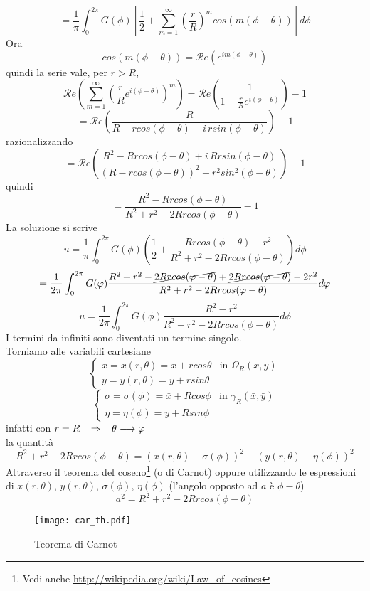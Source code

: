 \[
	= \frac{1}{\pi} \int_{0}^{2\pi} G(\phi)
	\left[
	\frac{1}{2}+ \sum_{m=1}^{\infty} \left( \frac{r}{R} \right)^m
	cos (m(\phi - \theta))
	\right] d\phi
\]
Ora
\[
	cos(m(\phi - \theta))= {\mathcal Re}(e^{im(\phi - \theta)})
\]
quindi la serie vale, per $r>R$,
\[
	{\mathcal Re} \left(
	\sum_{m=1}^{\infty} \left( \frac{r}{R} e^{i(\phi - \theta)} \right)^m
	\right)
	=
	{\mathcal Re} \left(
	\frac{1}{1 - \frac{r}{R} e^{i(\phi - \theta)}}
	\right) -1
\]
\[
	= {\mathcal Re} \left(
	\frac{R}{R -rcos(\phi - \theta) - i \, rsin (\phi - \theta)}
	\right) -1
\]
razionalizzando
\[
	= {\mathcal Re} \left(
	\frac{R^2 - Rrcos(\phi - \theta) + i \, Rr sin (\phi - \theta)}
	{\left( R- rcos (\phi - \theta) \right)^2 + r^2 sin^2 (\phi - \theta)}
	\right) -1
\]
quindi
\[
	=\frac{R^2 - Rrcos(\phi - \theta)}
	{R^2 + r^2 -2Rrcos(\phi - \theta)}
	-1
\]
La soluzione si scrive 
\[
	u= \frac{1}{\pi} \int_{0}^{2\pi} G(\phi)
	\left( \frac{1}{2}+
	\frac{Rrcos(\phi - \theta) -r^2}
	{R^2 + r^2 -2Rrcos(\phi - \theta)}
	\right)
	d\phi
\]
\[
	= \frac{1}{2 \pi} \int_{0}^{2\pi} G(\phi)
	\frac{R^2 + r^2 -\cancel{2Rrcos(\phi - \theta)} + 
	\cancel{2Rrcos(\phi - \theta)} -2r^2 }
	{R^2 + r^2 -2Rrcos(\phi - \theta)}
	d\phi
\]
\[
	u = \frac{1}{2 \pi} \int_{0}^{2\pi} G(\phi)
	\frac{R^2 - r^2 }
	{R^2 + r^2 -2Rrcos(\phi - \theta)}
	d\phi
\]
I termini da infiniti sono diventati un termine singolo.\\
Torniamo alle variabili cartesiane
\[
	\left\{ 
	\begin{array}{ll}
		x= x(r, \theta)= \bar{x} + rcos \theta 
		& \text{in } \Omega_R (\bar{x},\bar{y}) \\
		y= y(r, \theta)= \bar{y} + rsin \theta
	\end{array}
	\right.
\]
\[
	\left\{ 
	\begin{array}{ll}
		\sigma= \sigma(\phi)= \bar{x} + Rcos \phi
		& \text{in } \gamma_R (\bar{x},\bar{y}) \\
		\eta= \eta(\phi)= \bar{y} + Rsin \phi
	\end{array}
	\right. 
\]
infatti con $r=R \follows \theta \longrightarrow \phi$ \\
la quantit\`a
\[
	R^2 + r^2 -2Rrcos(\phi - \theta) =
	\left( x(r, \theta)- \sigma (\phi) \right)^2 +
	\left( y(r, \theta)- \eta (\phi) \right)^2
\]
Attraverso il teorema del coseno\footnote{Vedi anche
\url{http://wikipedia.org/wiki/Law_of_cosines}
} (o di Carnot) oppure utilizzando le espressioni di 
$x (r, \theta)$, $y(r, \theta)$, $\sigma (\phi)$, $\eta (\phi)$ (l'angolo
opposto ad $a$ \`e $\phi - \theta$)
\[
a^2= R^2 +r^2 -2Rrcos(\phi - \theta)
\]
\begin{figure}[H]
	\centering
	\texttt{[image: car\_th.pdf]}
	\caption{Teorema di Carnot}
	\label{car_th}
\end{figure}

